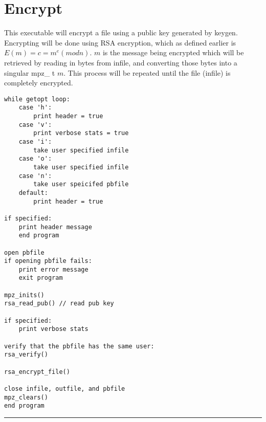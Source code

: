 \documentclass[
	12pt, %
]{fphw}
\begin{document}
\section{Encrypt}
This executable will encrypt a file using a public key generated by keygen. Encrypting will be done using RSA encryption, which as defined earlier is $E(m) = c = m^e (mod n)$. $m$ is the message being encrypted which will be retrieved by reading in bytes from infile, and converting those bytes into a singular mpz\_ t $m$. This process will be repeated until the file (infile) is completely encrypted.
\begin{lstlisting}[mathescape=true]
while getopt loop:
	case 'h':
		print header = true
	case 'v':
		print verbose stats = true
	case 'i':
		take user specified infile
	case 'o':
		take user specified infile
	case 'n':
		take user speicifed pbfile
	default:
		print header = true
		
if specified:
	print header message
	end program
	
open pbfile
if opening pbfile fails:
	print error message
	exit program
	
mpz_inits()
rsa_read_pub() // read pub key

if specified:
	print verbose stats
	
verify that the pbfile has the same user:
rsa_verify()	
	
rsa_encrypt_file()

close infile, outfile, and pbfile
mpz_clears()
end program
\end{lstlisting}

\noindent\rule{6.3in}{0.4pt}

\end{document}

